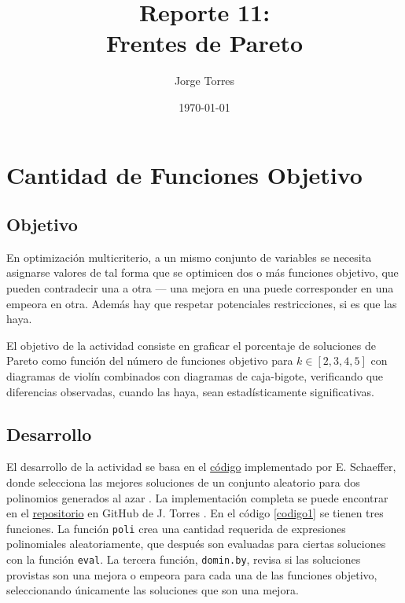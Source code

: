 \documentclass{report}
\title{Reporte 11:\\Frentes de Pareto}
\author{Jorge Torres}
\date{\today}
\begin{document}
\maketitle

\chapter{Cantidad de Funciones Objetivo}\label{cap1}

\section{Objetivo}
En optimizaci\'on multicriterio, a un mismo conjunto de variables se necesita asignarse valores de tal forma que se optimicen dos o m\'as funciones objetivo, que pueden contradecir una a otra — una mejora en una puede corresponder en una empeora en otra. Adem\'as hay que respetar potenciales restricciones, si es que las haya.

El objetivo de la actividad consiste en graficar el porcentaje de soluciones de Pareto como funci\'on del n\'umero de funciones objetivo para $k \in [2, 3, 4, 5]$ con diagramas de viol\'in combinados con diagramas de caja-bigote, verificando que diferencias observadas, cuando las haya, sean estad\'isticamente significativas.

\section{Desarrollo}
El desarrollo de la actividad se basa en el \href{https://github.com/satuelisa/Simulation/blob/master/ParetoFronts/violin.R}{c\'odigo} implementado por E. Schaeffer, donde selecciona las mejores soluciones de un conjunto aleatorio para dos polinomios generados al azar \cite{elisa1}. La implementaci\'on completa se puede encontrar en el \href{https://github.com/FeroxDeitas/Simulacion-Nano/blob/main/Tareas/P_11/Pareto.R}{repositorio} en GitHub de J. Torres \cite{jorge1}. En el c\'odigo \ref{codigo1} se tienen tres funciones. La funci\'on \texttt{poli} crea una cantidad requerida de expresiones polinomiales aleatoriamente, que despu\'es son evaluadas para ciertas soluciones con la funci\'on \texttt{eval}. La tercera funci\'on, \texttt{domin.by}, revisa si las soluciones provistas son una mejora o empeora para cada una de las funciones objetivo, seleccionando \'unicamente las soluciones que son una mejora.
\end{document}
